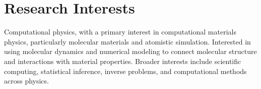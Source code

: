 \section{Research Interests}

Computational physics, with a primary interest in computational materials
physics, particularly molecular materials and atomistic simulation.
Interested in using molecular dynamics and numerical modeling to connect
molecular structure and interactions with material properties. Broader
interests include scientific computing, statistical inference, inverse
problems, and computational methods across physics.
